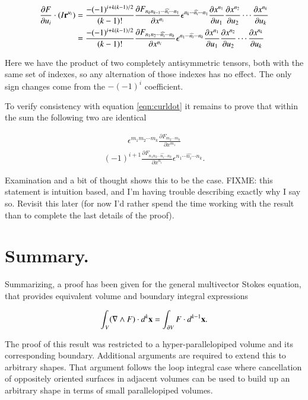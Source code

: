 \documentclass{article}
\newcommand{\grad}[0]{\nabla}
\newcommand{\PD}[2]{\frac{\partial {#2}}{\partial {#1}}}
\begin{document}
\begin{align*}
\PD{u_i}{F} \cdot (I \Br^{u_i})
&=
\frac{-(-1)^{i + k(k-1)/2}}{(k-1)!}
\PD{x^{n_i}}{F_{n_k n_{k-1} \cdots \widehat{n_i} \cdots n_{1}}}
\epsilon^{n_k \cdots \widehat{n_i} \cdots n_{1}} 
\PD{u_1}{x^{n_1}} \PD{u_2}{x^{n_2}} \cdots \PD{u_k}{x^{n_k}} \\
&=
\frac{-(-1)^{i + k(k-1)/2}}{(k-1)!}
\PD{x^{n_i}}{F_{n_1 n_{2} \cdots \widehat{n_i} \cdots n_{k}}}
\epsilon^{n_1 \cdots \widehat{n_i} \cdots n_{k}} 
\PD{u_1}{x^{n_1}} \PD{u_2}{x^{n_2}} \cdots \PD{u_k}{x^{n_k}} \\
\end{align*}

Here we have the product of two completely antisymmetric tensors, both with the same set of indexes, so any alternation of those indexes has
no effect.  The only sign changes come from the $-(-1)^i$ coefficient.

To verify consistency with equation \ref{eqn:curldot} it remains 
to prove that within the sum the following two are identical

\begin{align}\label{eqn:p1}
\epsilon^{m_1 m_2 \cdots m_k} \PD{x^{m_{1}}}{F_{m_2 \cdots m_{k}}}
\end{align}
\begin{align}\label{eqn:p2}
(-1)^{i+1}
\PD{x^{n_i}}{F_{n_1 n_{2} \cdots \widehat{n_i} \cdots n_{k}}}
\epsilon^{n_1 \cdots \widehat{n_i} \cdots n_{k}}.
\end{align}

Examination and a bit of thought shows this to be the case.
FIXME: this statement is intuition based, and I'm having trouble describing
exactly why I say so.  Revisit this later (for now I'd rather spend the time
working with the result than to complete the last details of the proof).

\section{ Summary. }

Summarizing, a proof has been given for the general multivector Stokes equation, that provides
equivalent volume and boundary integral expressions

\begin{equation}\label{eqn:genstokesSummary}
\int_V (\grad \wedge F) \cdot d^{k}\Bx = \int_{\partial V} F \cdot d^{k-1}\Bx.
\end{equation}

The proof of this result was restricted to a hyper-parallelopiped volume and its corresponding boundary.  Additional
arguments are required to extend this to arbitrary shapes.  That argument follows the loop integral case where cancellation
of oppositely oriented surfaces in adjacent volumes can be used to build up an arbitrary shape in terms of small 
parallelopiped volumes.
\end{document}
